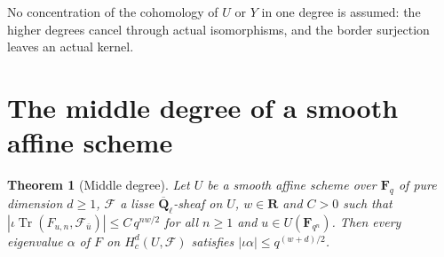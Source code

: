 \documentclass[11pt,a4paper]{article}
\theoremstyle{plain}
\newtheorem{theorem}{Theorem}[section]
\theoremstyle{definition}
\theoremstyle{remark}
\newcommand{\uses}[1]{\par\noindent{\small\textsf{Uses:} #1}\par\smallskip}
\newcommand{\Fq}{\mathbf F_q}
\newcommand{\Ql}{\overline{\mathbf Q}_\ell}
\newcommand{\F}{\mathcal F}
\newcommand{\Tr}{\operatorname{Tr}}
\begin{document}
\uses{\ref{cit:trace}, \ref{cit:kunneth}, \ref{cit:artin}, \ref{cit:duality}.}

No concentration of the cohomology of $U$ or $Y$ in one degree is assumed: the higher degrees cancel through actual
isomorphisms, and the border surjection leaves an actual kernel.

\section{The middle degree of a smooth affine scheme}

\begin{theorem}[Middle degree]\label{thm:middle}
Let $U$ be a smooth affine scheme over $\Fq$ of pure dimension $d\ge1$, $\F$ a lisse $\Ql$-sheaf on $U$, $w\in\mathbf R$
and $C>0$ such that $|\iota\Tr(F_{u,n},\F_{\bar u})|\le C\,q^{nw/2}$ for all $n\ge1$ and $u\in U(\mathbf F_{q^n})$. Then
every eigenvalue $\alpha$ of $F$ on $H^d_c(U,\F)$ satisfies $|\iota\alpha|\le q^{(w+d)/2}$.
\end{theorem}
\end{document}
